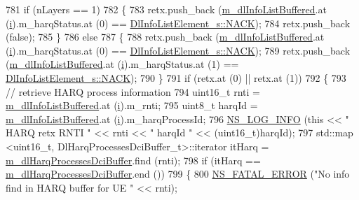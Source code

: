 \begin{DoxyCode}
781       \textcolor{keywordflow}{if} (nLayers == 1)
782         \{
783           retx.push\_back (\hyperlink{classns3_1_1TtaFfMacScheduler_af7afa3d5a610456175b21bad17cc04ae}{m\_dlInfoListBuffered}.at (\hyperlink{bernuolliDistribution_8m_a6f6ccfcf58b31cb6412107d9d5281426}{i}).m\_harqStatus.at (0) == 
      \hyperlink{structns3_1_1DlInfoListElement__s_a3e55b89f756b7bd8909c8116a202a17aaf90e76e67c86729b4ee21927b7fb1770}{DlInfoListElement\_s::NACK});
784           retx.push\_back (\textcolor{keyword}{false});
785         \}
786       \textcolor{keywordflow}{else}
787         \{
788           retx.push\_back (\hyperlink{classns3_1_1TtaFfMacScheduler_af7afa3d5a610456175b21bad17cc04ae}{m\_dlInfoListBuffered}.at (\hyperlink{bernuolliDistribution_8m_a6f6ccfcf58b31cb6412107d9d5281426}{i}).m\_harqStatus.at (0) == 
      \hyperlink{structns3_1_1DlInfoListElement__s_a3e55b89f756b7bd8909c8116a202a17aaf90e76e67c86729b4ee21927b7fb1770}{DlInfoListElement\_s::NACK});
789           retx.push\_back (\hyperlink{classns3_1_1TtaFfMacScheduler_af7afa3d5a610456175b21bad17cc04ae}{m\_dlInfoListBuffered}.at (\hyperlink{bernuolliDistribution_8m_a6f6ccfcf58b31cb6412107d9d5281426}{i}).m\_harqStatus.at (1) == 
      \hyperlink{structns3_1_1DlInfoListElement__s_a3e55b89f756b7bd8909c8116a202a17aaf90e76e67c86729b4ee21927b7fb1770}{DlInfoListElement\_s::NACK});
790         \}
791       \textcolor{keywordflow}{if} (retx.at (0) || retx.at (1))
792         \{
793           \textcolor{comment}{// retrieve HARQ process information}
794           uint16\_t rnti = \hyperlink{classns3_1_1TtaFfMacScheduler_af7afa3d5a610456175b21bad17cc04ae}{m\_dlInfoListBuffered}.at (\hyperlink{bernuolliDistribution_8m_a6f6ccfcf58b31cb6412107d9d5281426}{i}).m\_rnti;
795           uint8\_t harqId = \hyperlink{classns3_1_1TtaFfMacScheduler_af7afa3d5a610456175b21bad17cc04ae}{m\_dlInfoListBuffered}.at (\hyperlink{bernuolliDistribution_8m_a6f6ccfcf58b31cb6412107d9d5281426}{i}).m\_harqProcessId;
796           \hyperlink{group__logging_gafbd73ee2cf9f26b319f49086d8e860fb}{NS\_LOG\_INFO} (\textcolor{keyword}{this} << \textcolor{stringliteral}{" HARQ retx RNTI "} << rnti << \textcolor{stringliteral}{" harqId "} << (uint16\_t)harqId);
797           std::map <uint16\_t, DlHarqProcessesDciBuffer\_t>::iterator itHarq = 
      \hyperlink{classns3_1_1TtaFfMacScheduler_aef07d22e5c2e6acf1f711736bce49fc8}{m\_dlHarqProcessesDciBuffer}.find (rnti);
798           \textcolor{keywordflow}{if} (itHarq == \hyperlink{classns3_1_1TtaFfMacScheduler_aef07d22e5c2e6acf1f711736bce49fc8}{m\_dlHarqProcessesDciBuffer}.end ())
799             \{
800               \hyperlink{group__fatal_ga5131d5e3f75d7d4cbfd706ac456fdc85}{NS\_FATAL\_ERROR} (\textcolor{stringliteral}{"No info find in HARQ buffer for UE "} << rnti);

\end{DoxyCode}
